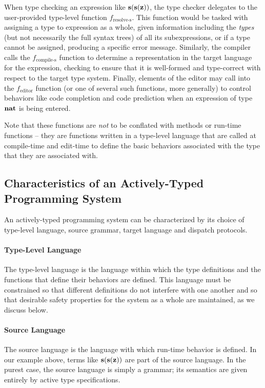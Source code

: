 When type checking an expression like $\textbf{s}(\textbf{s}(\textbf{z}))$, the type checker delegates to the user-provided type-level function $f_{\text{resolve-s}}$. This function would be tasked with assigning a type to expression as a whole, given information including the \emph{types} (but not necessarily the full syntax trees) of all its subexpressions, or if a type cannot be assigned, producing a specific error message. Similarly, the compiler calls the $f_{\text{compile-s}}$ function to determine a representation in the target language for the expression, checking to ensure that it is well-formed and type-correct with respect to the target type system. Finally, elements of the editor may call into the $f_{\text{editor}}$ function (or one of several such functions, more generally) to control behaviors like code completion and code prediction when an expression of type $\textbf{nat}$ is being entered. 

Note that these functions are \emph{not} to be conflated with methods or run-time functions -- they are functions written in a type-level language that are called at compile-time and edit-time to define the basic behaviors associated with the type that they are associated with.

\subsection{Characteristics of an Actively-Typed Programming System}
An actively-typed programming system can be characterized by its choice of type-level language, source grammar, target language and dispatch protocols.

\paragraph{Type-Level Language} The type-level language is the language within which the type definitions and the functions that define their behaviors are defined. This language must be constrained so that different definitions do not interfere with one another and so that desirable safety properties for the system as a whole are maintained, as we discuss below.

\paragraph{Source Language} The source language is the language with which run-time behavior is defined. In our example above, terms like $\textbf{s}(\textbf{s}(\textbf{z}))$ are part of the source language. In the purest case, the source language is simply a grammar; its semantics are given entirely by active type specifications.

